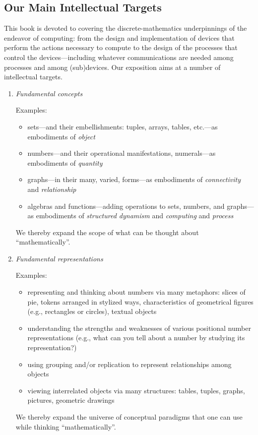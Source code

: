 \subsection{Our Main Intellectual Targets}
\label{sec:book-overwiew}

This book is devoted to covering the discrete-mathematics underpinnings of the endeavor of computing: from the design and implementation of devices that perform the actions necessary to
compute to the design of the processes that control the devices---including whatever communications are needed among processes and among (sub)devices.  Our exposition aims at a number of intellectual targets.
\begin{enumerate}
\item
{\it Fundamental concepts}

\medskip

{\small\sf Examples:}
\begin{itemize}
\item%
sets---and their embellishments: tuples, arrays, tables, etc.---as embodiments of {\it object}
\item
numbers---and their operational manifestations, numerals---as embodiments of {\it quantity}
\item
graphs---in their many, varied, forms---as embodiments of {\it connectivity} and {\it relationship}
\item
algebras and functions---adding operations to sets, numbers, and graphs---as embodiments of {\it structured dynamism} and {\it computing} and {\it process}
\end{itemize}
We thereby expand the scope of what can be thought about ``mathematically''.

\medskip

\item
{\it Fundamental representations}

\medskip

{\small\sf Examples:}
\begin{itemize}
\item
representing and thinking about numbers via many metaphors: slices of pie, tokens arranged in stylized ways, characteristics of geometrical figures (e.g., rectangles or circles), textual objects
\item
understanding the strengths and weaknesses of various positional number representations (e.g., what can you tell about a number by studying its representation?)
\item
using grouping and/or replication to represent relationships among objects
\item
viewing interrelated objects via many structures: tables, tuples, graphs, pictures, geometric drawings
\end{itemize}
We thereby expand the universe of conceptual paradigms that one can use while thinking ``mathematically''.


\end{enumerate}
